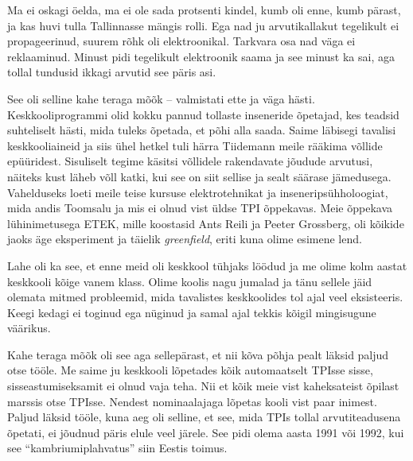 
Ma ei oskagi öelda, ma ei ole sada protsenti kindel, kumb oli enne, kumb 
pärast, ja kas huvi tulla Tallinnasse mängis rolli. Ega nad ju 
arvutikallakut tegelikult ei propageerinud, suurem rõhk oli elektroonikal. 
Tarkvara osa nad väga ei reklaaminud. Minust pidi tegelikult elektroonik saama 
ja see minust ka sai, aga tollal tundusid ikkagi arvutid 
see päris asi. 


See oli selline kahe teraga mõõk -- valmistati ette ja 
väga hästi. Keskkooliprogrammi olid kokku pannud 
tollaste inseneride õpetajad, kes teadsid suhteliselt hästi, mida tuleks 
õpetada, et põhi alla saada. Saime 
läbisegi tavalisi keskkooliaineid ja siis ühel hetkel tuli härra 
Tiidemann meile rääkima võllide 
epüüridest. Sisuliselt tegime käsitsi võllidele 
rakendavate jõudude arvutusi, näiteks kust läheb võll katki, kui see on siit
sellise ja sealt säärase jämedusega. Vahelduseks loeti meile 
teise kursuse elektrotehnikat ja 
inseneripsühholoogiat, mida andis Toomsalu ja mis ei 
olnud vist üldse TPI õppekavas. Meie õppekava lühinimetusega ETEK, 
mille koostasid Ants Reili ja 
Peeter Grossberg, oli kõikide jaoks äge 
eksperiment ja täielik \emph{greenfield}, eriti kuna 
olime esimene lend. 

Lahe oli ka see, et enne meid oli keskkool tühjaks löödud ja me olime kolm 
aastat keskkooli kõige 
vanem klass. Olime koolis nagu jumalad ja 
tänu sellele jäid olemata mitmed probleemid, mida tavalistes 
keskkoolides tol ajal veel eksisteeris. Keegi kedagi ei toginud ega 
nüginud ja samal ajal tekkis kõigil mingisugune väärikus. 

Kahe teraga mõõk oli see aga sellepärast, et nii kõva põhja pealt läksid paljud 
otse tööle. Me saime ju keskkooli lõpetades kõik  
automaatselt TPIsse sisse, sisseastumiseksamit ei olnud vaja teha. Nii et kõik 
meie vist kaheksateist õpilast marssis otse TPIsse. Nendest 
nominaalajaga lõpetas kooli vist paar inimest. Paljud läksid tööle, kuna aeg 
oli 
selline, et see, mida TPIs tollal arvutiteadusena õpetati, ei jõudnud 
päris elule veel järele. See pidi olema aasta 1991 või 1992, kui 
see \enquote{kambriumiplahvatus} siin Eestis toimus.

